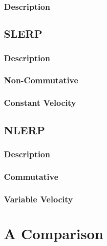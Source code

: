 \documentclass{article}[12pt]
\begin{document}
\subsubsection*{Description}
\subsection*{SLERP}
\subsubsection*{Description}
\subsubsection*{Non-Commutative}
\subsubsection*{Constant Velocity}
\subsection*{NLERP}
\subsubsection*{Description}
\subsubsection*{Commutative}
\subsubsection*{Variable Velocity}
\section*{A Comparison}
\end{document}
